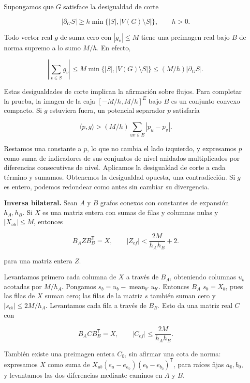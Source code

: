 \documentclass[spanish,11pt,a4paper]{article}
\begin{document}
Supongamos que \(G\) satisface la desigualdad de corte

\[|\partial_G S|\ge h\min\{|S|,|V(G)\setminus S|\},\qquad h>0.\tag{F.1}\]

Todo vector real \(g\) de suma cero con \(|g_{v}|\le M\) tiene una preimagen real bajo \(B\) de norma supremo a lo sumo \(M/h\). En efecto,

\[\left|\sum_{v\in S}g_v\right|\le M\min\{|S|,|V(G)\setminus S|\}\le(M/h)|\partial_G S|.\]

Estas desigualdades de corte implican la afirmación sobre flujos. Para completar la prueba, la imagen de la caja \([-M/h,M/h]^E\) bajo \(B\) es un conjunto convexo compacto. Si \(g\) estuviera fuera, un potencial separador \(p\) satisfaría

\[\langle p,g\rangle>(M/h)\sum_{uv\in E}|p_u-p_v|.\]

Restamos una constante a \(p\), lo que no cambia el lado izquierdo, y expresamos \(p\) como suma de indicadores de sus conjuntos de nivel anidados multiplicados por diferencias consecutivas de nivel. Aplicamos la desigualdad de corte a cada término y sumamos. Obtenemos la desigualdad opuesta, una contradicción. Si \(g\) es entero, podemos redondear como antes sin cambiar su divergencia.

\textbf{Inversa bilateral.} Sean \(A\) y \(B\) grafos conexos con constantes de expansión \(h_{A},h_{B}\). Si \(X\) es una matriz entera con sumas de filas y columnas nulas y \(|X_{ab}|\le M\), entonces

\[B_A Z B_B^{\mathsf T}=X,\qquad |Z_{ef}|<\frac{2M}{h_Ah_B}+2.\tag{F.2}\]

para una matriz entera \(Z\).

Levantamos primero cada columna de \(X\) a través de \(B_{A}\), obteniendo columnas \(u_{b}\) acotadas por \(M/h_{A}\). Pongamos \(s_b=u_b-\operatorname{mean}_{b\prime}u_{b\prime}\). Entonces \(B_{A}\) \(s_{b}=X_{b}\), pues las filas de \(X\) suman cero; las filas de la matriz \(s\) también suman cero y \(|s_{eb}|\le 2M/h_{A}\). Levantamos cada fila a través de \(B_{B}\). Esto da una matriz real \(C\) con

\[B_A C B_B^{\mathsf T}=X,\qquad |C_{ef}|\le\frac{2M}{h_Ah_B}.\tag{F.3}\]

También existe una preimagen entera \(C_{0}\), sin afirmar una cota de norma: expresamos \(X\) como suma de \(X_{ab}(e_a-e_{a_0})(e_b-e_{b_0})^{\mathsf T}\), para raíces fijas \(a_0,b_0\), y levantamos las dos diferencias mediante caminos en \(A\) y \(B\).
\end{document}
